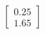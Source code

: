 \documentclass[preview]{standalone}
\begin{document}
\begin{align*}
\begin{bmatrix} 0.25 \\ 1.65 \end{bmatrix}
\end{align*}
\end{document}
